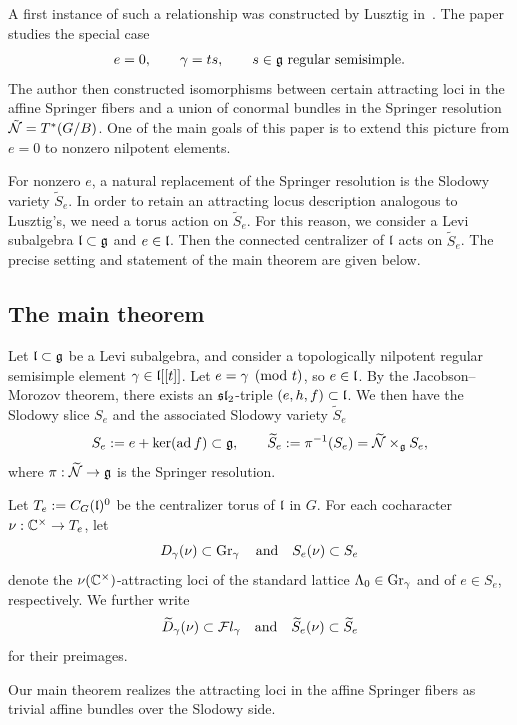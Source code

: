 \documentclass[11pt]{article}
\numberwithin{equation}{section}
\begin{document}
A first instance of such a relationship was constructed by Lusztig
in~\cite{remarkASF}. The paper studies the special case 
\[
e=0, \qquad \gamma=ts,
\qquad s\in\mathfrak{g} \text{ regular semisimple}.
\]
The author then constructed isomorphisms between certain attracting loci in the
affine Springer fibers and a union of conormal bundles in the Springer resolution $\tilde{\mathcal{N}}=T^*(G/B)$.
One of the main goals of this paper is to extend this picture from
$e=0$ to nonzero nilpotent elements.

For nonzero $e$, a natural replacement of the Springer
resolution is the Slodowy variety $\widetilde S_e$. In order to retain an
attracting locus description analogous to Lusztig's, we need a torus action
on $\widetilde S_e$. For this reason, we consider a Levi subalgebra
$\mathfrak{l}\subset\mathfrak{g}$ and $e\in \mathfrak{l}$. Then the connected centralizer of $\mathfrak{l}$ acts on $\widetilde{S}_e$. The precise setting and statement of the main theorem are
given below.

\subsection{The main theorem}
Let $\mathfrak{l}\subset \mathfrak{g}$ be a Levi subalgebra, and consider a topologically nilpotent regular semisimple element $\gamma\in \mathfrak{l}[[t]]$. Let $e=\gamma\pmod{t}$, so $e\in \mathfrak{l}$. By the Jacobson--Morozov theorem, there exists an $\mathfrak{sl}_2$-triple $(e,h,f)\subset \mathfrak{l}$. We then have the Slodowy slice $S_e$ and the associated Slodowy variety $\widetilde{S}_e$
\[
S_e := e+\ker(\operatorname{ad} f)\subset \mathfrak{g}, \qquad 
\widetilde{S}_e := \pi^{-1}(S_e)=\widetilde{\mathcal{N}}\times_{\mathfrak{g}} S_e,
\]
where $\pi:\widetilde{\mathcal{N}}\rightarrow\mathfrak{g}$ is the Springer resolution.

Let $T_e:=C_G(\mathfrak{l})^0$ be the centralizer torus of $\mathfrak{l}$ in $G$. For each cocharacter $\nu:\mathbb{C}^\times\to T_e$, let
\[
D_\gamma(\nu)\subset \operatorname{Gr}_\gamma 
\quad\text{and}\quad 
S_e(\nu)\subset S_e
\]
denote the $\nu(\mathbb{C}^\times)$-attracting loci of the standard lattice $\Lambda_0\in \operatorname{Gr}_\gamma$ and of $e\in S_e$, respectively. We further write
\[
\widetilde{D}_\gamma(\nu)\subset \mathcal{F}l_\gamma 
\quad\text{and}\quad 
\widetilde{S}_e(\nu)\subset \widetilde{S}_e
\]
for their preimages.

Our main theorem realizes the attracting loci in the affine Springer fibers as
trivial affine bundles over the Slodowy side.
\end{document}
